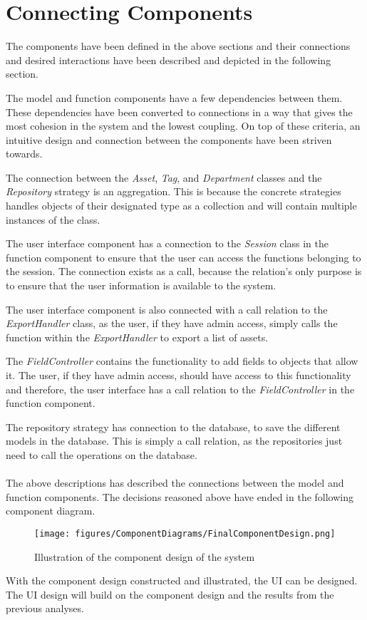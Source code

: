 \section{Connecting Components} \label{sc:connecting_components}
The components have been defined in the above sections and their connections and desired interactions have been described and depicted in the following section.
\par
The model and function components have a few dependencies between them. These dependencies have been converted to connections in a way that gives the most cohesion in the system and the lowest coupling. On top of these criteria, an intuitive design and connection between the components have been striven towards.
\par
The connection between the \textit{Asset}, \textit{Tag}, and \textit{Department} classes and the \textit{Repository} strategy is an aggregation. This is because the concrete strategies handles objects of their designated type as a collection and will contain multiple instances of the class.
\par
The user interface component has a connection to the \textit{Session} class in the function component to ensure that the user can access the functions belonging to the session. The connection exists as a call, because the relation's only purpose is to ensure that the user information is available to the system.
\par
The user interface component is also connected with a call relation to the \textit{ExportHandler} class, as the user, if they have admin access, simply calls the function within the \textit{ExportHandler} to export a list of assets.
\par
The \textit{FieldController} contains the functionality to add fields to objects that allow it. The user, if they have admin access, should have access to this functionality and therefore, the user interface has a call relation to the \textit{FieldController} in the function component.
\par
The repository strategy has connection to the database, to save the different models in the database. This is simply a call relation, as the repositories just need to call the operations on the database.\\\\
The above descriptions has described the connections between the model and function components. The decisions reasoned above have ended in the following component diagram.

\begin{figure}[H]
    \centering
    \texttt{[image: figures/ComponentDiagrams/FinalComponentDesign.png]}
    \caption{Illustration of the component design of the system}
    \label{fig:FinalComponentDesign}
\end{figure}

With the component design constructed and illustrated, the UI can be designed. The UI design will build on the component design and the results from the previous analyses.